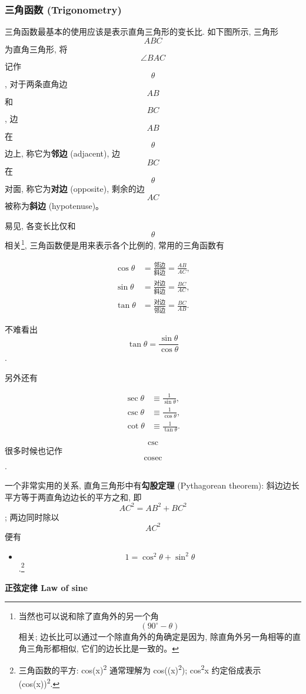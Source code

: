 \hypertarget{ux4e09ux89d2ux51fdux6570-trigonometry}{%
\subsubsection{三角函数
(Trigonometry)}\label{ux4e09ux89d2ux51fdux6570-trigonometry}}

三角函数最基本的使用应该是表示直角三角形的变长比. 如下图所示, 三角形
\[ABC\] 为直角三角形, 将 \[\angle BAC\] 记作 \[\theta\], 对于两条直角边
\[AB\] 和 \[BC\], 边 \[AB\] 在 \[\theta\] 边上, 称它为\textbf{邻边}
(adjacent), 边 \[BC\] 在 \[\theta\] 对面, 称它为\textbf{对边}
(opposite), 剩余的边 \[AC\] 被称为\textbf{斜边} (hypotenuse)。

易见, 各变长比仅和 \[\theta\] 相关\footnote{当然也可以说和除了直角外的另一个角
  \[(90^\circ-\theta)\] 相关; 边长比可以通过一个除直角外的角确定是因为,
  除直角外另一角相等的直角三角形都相似, 它们的边长比是一致的。},
三角函数便是用来表示各个比例的, 常用的三角函数有

\[\begin{align*}\cos\theta&=\frac{邻边}{斜边}=\frac{AB}{AC},\\
\sin\theta&=\frac{对边}{斜边}=\frac{BC}{AC},\\
\tan\theta&=\frac{对边}{邻边}=\frac{BC}{AB}.\end{align*}\]

不难看出\[\tan\theta=\frac{\sin\theta}{\cos\theta}\].

另外还有

\[\begin{align*}\sec\theta&\equiv\frac{1}{\sin\theta},\\
\csc\theta&\equiv\frac{1}{\cos\theta},\\
\cot\theta&\equiv\frac{1}{\tan\theta}.\end{align*}\]

\[\csc\] 很多时候也记作 \[\text{cosec}\].

一个非常实用的关系, 直角三角形中有\textbf{勾股定理} (Pythagorean
theorem): 斜边边长平方等于两直角边边长的平方之和, 即 \[AC^2=AB^2+BC^2\];
两边同时除以 \[AC^2\] 便有

\begin{itemize}
\tightlist
\item
  \[\boxed{1=\cos^2\theta+\sin^2\theta}\].\footnote{三角函数的平方:
    cos(x)\textsuperscript{2} 通常理解为 cos((x)\textsuperscript{2});
    cos\textsuperscript{2}x 约定俗成表示 (cos(x))\textsuperscript{2}.}
\end{itemize}

\textbf{正弦定律 Law of sine}

